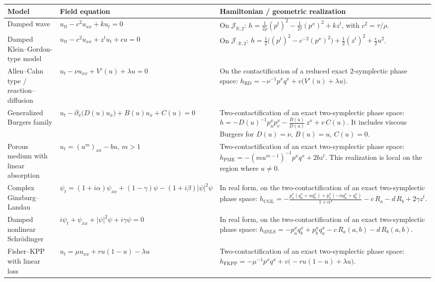 \documentclass[11pt,a4paper]{article}
\theoremstyle{plain} \newtheorem{theorem}{Theorem}[section] \newtheorem{proposition}[theorem]{Proposition} \newtheorem{corollary}[theorem]{Corollary} \newtheorem{lemma}[theorem]{Lemma} \theoremstyle{definition} \newtheorem{definition}[theorem]{Definition} \theoremstyle{remark} \newtheorem{remark}[theorem]{Remark} \newtheorem{example}[theorem]{Example} %
\begin{document}
\begin{table}[ht]
\centering
\footnotesize
\setlength{\tabcolsep}{4pt}
\renewcommand{\arraystretch}{1.18}
\begin{tabularx}{\textwidth}{|p{2.7cm}|Y|Y|}
\hline
\textbf{Model} & \textbf{Field equation} & \textbf{Hamiltonian / geometric realization} \\
\hline
Damped wave & \(u_{tt}-c^2u_{xx}+k u_t=0\) & On \(\mathcal J_{\mathbb R,2}\): \(h=\frac{1}{2\rho}(p^t)^2-\frac{1}{2\tau}(p^x)^2+k z^t\), with \(c^2=\tau/\rho\). \\
\hline
Damped Klein--Gordon-type model & \(u_{tt}-c^2u_{xx}+z^t u_t+\epsilon u=0\) & On \(\mathcal{J}_{:\mathbb{R},2}\): \(h=\frac12\bigl((p^t)^2-c^{-2}(p^x)^2\bigr)+\frac12(z^t)^2+\frac{\epsilon}{2}u^2\). \\
\hline
Allen--Cahn type / reaction--diffusion & \(u_t-\nu u_{xx}+V'(u)+\lambda u=0\) & On the contactification of a reduced exact \(2\)-symplectic phase space: \(h_{\mathrm{RD}}=-\nu^{-1}p^xq^x+v\bigl(V'(u)+\lambda u\bigr)\). \\
\hline
Generalized Burgers family & \(u_t-\partial_x\!\bigl(D(u)u_x\bigr)+B(u)u_x+C(u)=0\) & Two-contactification of an exact two-symplectic phase space: \(h=-D(u)^{-1}p_u^x p_v^x-\frac{B(u)}{D(u)}\,z^x+v\,C(u)\). It includes viscous Burgers for \(D(u)=\nu\), \(B(u)=u\), \(C(u)=0\). \\
\hline
Porous medium with linear absorption& \(u_t=(u^m)_{xx}-bu\), \(m>1\) & Two-contactification of an exact two-symplectic phase space: \(h_{\mathrm{PME}}=-(m u^{m-1})^{-1}p^x q^x+2bz^t\). This realization is local on the region where \(u\neq0\). \\
\hline
Complex Ginzburg--Landau & \(\psi_t=(1+i\alpha)\psi_{xx}+(1-\gamma)\psi-(1+i\beta)|\psi|^2\psi\) & In real form, on the two-contactification of an exact two-symplectic phase space: \(h_{\mathrm{CGL}}=-\frac{p_a^x(q_a^x+\alpha q_b^x)+p_b^x(-\alpha q_a^x+q_b^x)}{1+\alpha^2}-c\,R_a-d\,R_b+2\gamma z^t\). \\
\hline
Damped nonlinear Schr\"odinger & \(i\psi_t+\psi_{xx}+|\psi|^2\psi+i\gamma\psi=0\) & In real form, on the two-contactification of an exact two-symplectic phase space: \(h_{\mathrm{dNLS}}=-p_a^x q_b^x+p_b^x q_a^x-c\,R_a(a,b)-d\,R_b(a,b)\). \\
\hline
Fisher--KPP with linear loss & \(u_t=\mu u_{xx}+ru(1-u)-\lambda u\) & Two-contactification of an exact two-symplectic phase space: \(h_{\mathrm{FKPP}}=-\mu^{-1}p^xq^x+v\bigl(-ru(1-u)+\lambda u\bigr)\). \\

\end{tabularx}
\end{table}
\end{document}
